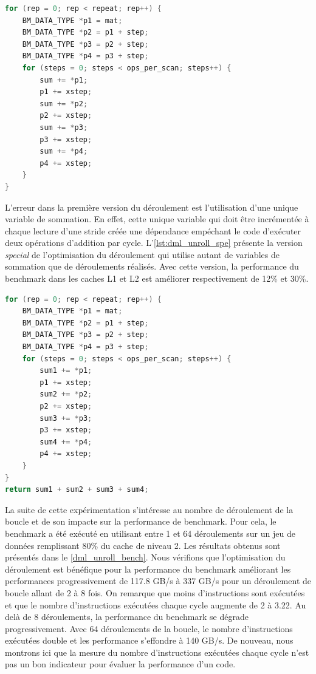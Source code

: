     \begin{lstlisting}[label=lst:dml_unroll_orig ,language=C, caption=Première version du déroulement de la boucle par 4.]
for (rep = 0; rep < repeat; rep++) {
    BM_DATA_TYPE *p1 = mat;
    BM_DATA_TYPE *p2 = p1 + step;
    BM_DATA_TYPE *p3 = p2 + step;
    BM_DATA_TYPE *p4 = p3 + step;
    for (steps = 0; steps < ops_per_scan; steps++) {
        sum += *p1;
        p1 += xstep;
        sum += *p2;
        p2 += xstep;
        sum += *p3;
        p3 += xstep;
        sum += *p4;
        p4 += xstep;
    }
}
\end{lstlisting}


    L'erreur dans la première version du déroulement est l'utilisation d'une unique variable de sommation. En effet, cette unique variable qui doit être incrémentée à chaque lecture d'une stride créée une dépendance empéchant le code d'exécuter deux opérations d'addition par cycle. L'\autoref{lst:dml_unroll_spe} présente la version \textit{special} de l'optimisation du déroulement qui utilise autant de variables de sommation que de déroulements réalisés. Avec cette version, la performance du benchmark dans les caches L1 et L2 est améliorer respectivement de 12\% et 30\%. 
    
    \begin{lstlisting}[label=lst:dml_unroll_spe ,language=C, caption=Deuxième version du déroulement par 4 utilisant 4 variables sum.]
for (rep = 0; rep < repeat; rep++) {
    BM_DATA_TYPE *p1 = mat;
    BM_DATA_TYPE *p2 = p1 + step;
    BM_DATA_TYPE *p3 = p2 + step;
    BM_DATA_TYPE *p4 = p3 + step;
    for (steps = 0; steps < ops_per_scan; steps++) {
        sum1 += *p1;
        p1 += xstep;
        sum2 += *p2;
        p2 += xstep;
        sum3 += *p3;
        p3 += xstep;
        sum4 += *p4;
        p4 += xstep;
    }
}
return sum1 + sum2 + sum3 + sum4;
\end{lstlisting}
    
    La suite de cette expérimentation s'intéresse au nombre de déroulement de la boucle et de son impacte sur la performance de benchmark. Pour cela, le benchmark a été exécuté en utilisant entre 1 et 64 déroulements sur un jeu de données remplissant 80\% du cache de niveau 2. Les résultats obtenus sont présentés dans le \autoref{dml_unroll_bench}. Nous vérifions que l'optimisation du déroulement est bénéfique pour la performance du benchmark améliorant les performances progressivement de 117.8 GB/s à 337 GB/s pour un déroulement de boucle allant de 2 à 8 fois. On remarque que moins d'instructions sont exécutées et que le nombre d'instructions exécutées chaque cycle augmente de 2 à 3.22. Au delà de 8 déroulements, la performance du benchmark se dégrade progressivement. Avec 64 déroulements de la boucle, le nombre d'instructions exécutées double et les performance s'effondre à 140 GB/s. De nouveau, nous montrons ici que la mesure du nombre d'instructions exécutées chaque cycle n'est pas un bon indicateur pour évaluer la performance d'un code. 
    
